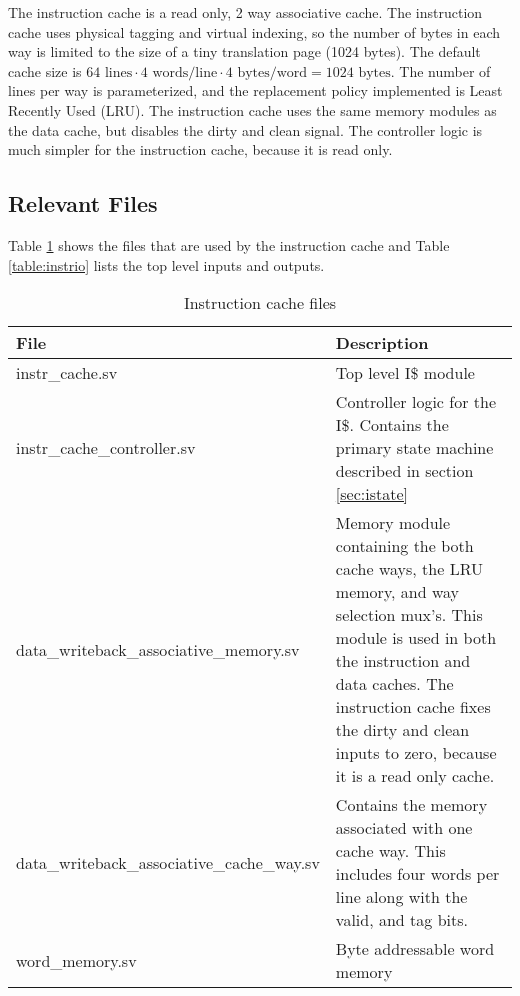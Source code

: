 The instruction cache is a read only, 2 way associative cache. 
The instruction cache uses physical tagging and virtual indexing, so the number of bytes in each way is limited to the size of a tiny translation page (1024 bytes). 
The default cache size is $64 \text{ lines} \cdot 4 \text{ words/line} \cdot 4 \text{ bytes/word} = 1024 \text{ bytes}$. 
The number of lines per way is parameterized, and the replacement policy implemented is Least Recently Used (LRU).
The instruction cache uses the same memory modules as the data cache, but disables the dirty and clean signal.
The controller logic is much simpler for the instruction cache, because it is read only.

\subsection{Relevant Files}

	Table \ref{table:irel} shows the files that are used by the instruction cache and Table \ref{table:instrio} lists the top level inputs and outputs.

	\begin{table} \label{table:irel}
	\begin{tabular}{|l|p{70mm}|}
	\hline File  & Description \\ 
	\hline  instr\_cache.sv & Top level I\$ module \\ 
	\hline  instr\_cache\_controller.sv & Controller logic for the I\$.
	Contains the primary state machine described in section \ref{sec:istate} \\ 
	\hline  data\_writeback\_associative\_memory.sv & 
	Memory module containing the both cache ways, the LRU memory, and way selection mux's.
	This module is used in both the instruction and data caches.
	The instruction cache fixes the dirty and clean inputs to zero, because it is a read only cache.\\ 
	\hline  data\_writeback\_associative\_cache\_way.sv & 
	Contains the memory associated with one cache way. This includes four words per line along with the valid, and tag bits. \\ 
	\hline  word\_memory.sv & Byte addressable word memory  \\
	\hline
	\end{tabular} 
	\caption{Instruction cache files}
	\end{table}

